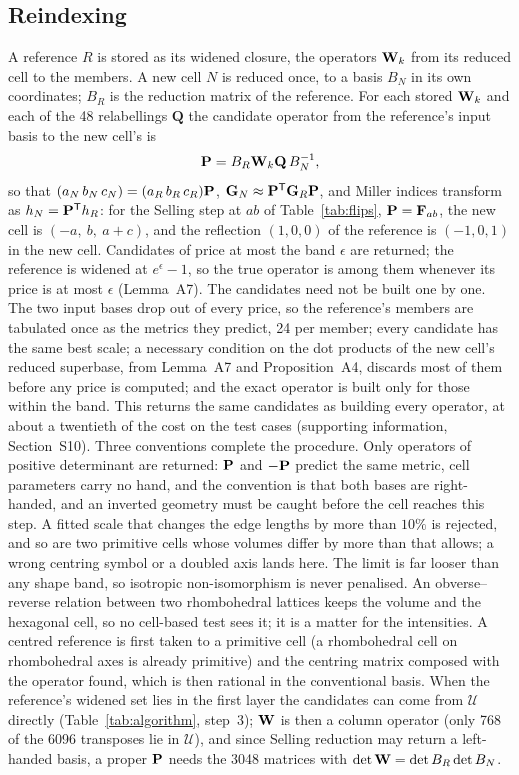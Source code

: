 \subsection{Reindexing}
\label{sec:reindex-method}
A reference $R$ is stored as its widened closure, the operators $\Wop_k$ from its reduced cell to the members. A new cell $N$ is reduced once, to a basis $B_N$ in its own coordinates; $B_R$ is the reduction matrix of the reference. For each stored $\Wop_k$ and each of the 48 relabellings $\mathbf Q$ the candidate operator from the reference's input basis to the new cell's is
\begin{equation}
\Pop=B_R\Wop_k\mathbf Q\,B_N^{-1},
\label{eq:candidate}
\end{equation}
so that $(a_N\,b_N\,c_N)=(a_R\,b_R\,c_R)\Pop$, $\Gmet_N\approx\Pop^{\mathsf T}\Gmet_R\Pop$, and Miller indices transform as $h_N=\Pop^{\mathsf T}h_R$: for the Selling step at $ab$ of Table~\ref{tab:flips}, $\Pop=\mathbf F_{ab}$, the new cell is $(-a,\ b,\ a+c)$, and the reflection $(1,0,0)$ of the reference is $(-1,0,1)$ in the new cell. Candidates of price at most the band $\epsilon$ are returned; the reference is widened at $e^\epsilon-1$, so the true operator is among them whenever its price is at most $\epsilon$ (Lemma~A7). The candidates need not be built one by one. The two input bases drop out of every price, so the reference's members are tabulated once as the metrics they predict, 24 per member; every candidate has the same best scale; a necessary condition on the dot products of the new cell's reduced superbase, from Lemma~A7 and Proposition~A4, discards most of them before any price is computed; and the exact operator is built only for those within the band. This returns the same candidates as building every operator, at about a twentieth of the cost on the test cases (supporting information, Section~S10). Three conventions complete the procedure. Only operators of positive determinant are returned: $\Pop$ and $-\Pop$ predict the same metric, cell parameters carry no hand, and the convention is that both bases are right-handed, and an inverted geometry must be caught before the cell reaches this step. A fitted scale that changes the edge lengths by more than $10\%$ is rejected, and so are two primitive cells whose volumes differ by more than that allows; a wrong centring symbol or a doubled axis lands here. The limit is far looser than any shape band, so isotropic non-isomorphism is never penalised. An obverse--reverse relation between two rhombohedral lattices keeps the volume and the hexagonal cell, so no cell-based test sees it; it is a matter for the intensities. A centred reference is first taken to a primitive cell (a rhombohedral cell on rhombohedral axes is already primitive) and the centring matrix composed with the operator found, which is then rational in the conventional basis. When the reference's widened set lies in the first layer the candidates can come from $\mathcal U$ directly (Table~\ref{tab:algorithm}, step~3); $\Wop$ is then a column operator (only 768 of the 6096 transposes lie in $\mathcal U$), and since Selling reduction may return a left-handed basis, a proper $\Pop$ needs the 3048 matrices with $\det\Wop=\det B_R\det B_N$.

